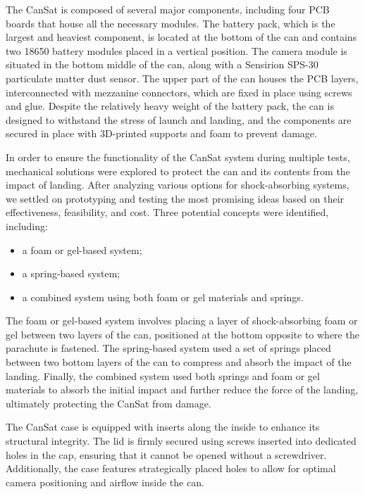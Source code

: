 \documentclass[11pt]{article}
\begin{document}
The CanSat is composed of several major components, including four PCB boards that house all the necessary modules. The battery pack, which is the largest and heaviest component, is located at the bottom of the can and contains two 18650 battery modules placed in a vertical position. The camera module is situated in the bottom middle of the can, along with a Sensirion SPS-30 particulate matter dust sensor. The upper part of the can houses the PCB layers, interconnected with mezzanine connectors, which are fixed in place using screws and glue. Despite the relatively heavy weight of the battery pack, the can is designed to withstand the stress of launch and landing, and the components are secured in place with 3D-printed supports and foam to prevent damage.

In order to ensure the functionality of the CanSat system during multiple tests, mechanical solutions were explored to protect the can and its contents from the impact of landing. After analyzing various options for shock-absorbing systems, we settled on prototyping and testing the most promising ideas based on their effectiveness, feasibility, and cost. Three potential concepts were identified, including:
\begin{itemize}[leftmargin=1cm,itemindent=0.5cm, noitemsep, topsep=0pt, label=$\bullet$]
    \item a foam or gel-based system;
    \item a spring-based system;
    \item a combined system using both foam or gel materials and springs.
\end{itemize}

The foam or gel-based system involves placing a layer of shock-absorbing foam or gel between two layers of the can, positioned at the bottom opposite to where the parachute is fastened. The spring-based system used a set of springs placed between two bottom layers of the can to compress and absorb the impact of the landing. Finally, the combined system used both springs and foam or gel materials to absorb the initial impact and further reduce the force of the landing, ultimately protecting the CanSat from damage.

The CanSat case is equipped with inserts along the inside to enhance its structural integrity. The lid is firmly secured using screws inserted into dedicated holes in the cap, ensuring that it cannot be opened without a screwdriver. Additionally, the case features strategically placed holes to allow for optimal camera positioning and airflow inside the can. 
\end{document}
